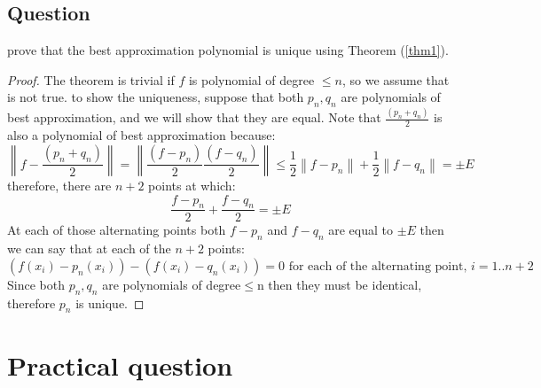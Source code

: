 \documentclass[]{article}
\newcommand{\norm}[1]{\left\lVert#1\right\rVert}
\begin{document}
\subsection{Question}
prove that the best approximation polynomial is unique using Theorem (\ref{thm1}). 
\begin{proof}
	The theorem is trivial if $f$ is polynomial of degree $\leq n$, so we assume that is not true. to show the uniqueness, suppose that both $p_n, q_n$ are polynomials of best approximation, and we will show that they are equal.
	Note that $\frac{(p_n + q_n)}{2}$ is also a polynomial of best approximation because:
	\begin{equation*}
		 \norm{f-\frac{(p_n + q_n)}{2}} = \norm{\frac{(f - p_n)}{2} \frac{(f - q_n)}{2}} \leq \frac{1}{2}\norm{f-p_n} + 
		 \frac{1}{2}\norm{f-q_n} = \pm E
	\end{equation*}
	therefore, there are $n+2$ points at which:
	\begin{equation*}
		\frac{f-p_n}{2}+\frac{f-q_n}{2}=\pm E
	\end{equation*}
	At each of those alternating points both $f-p_n$ and $f-q_n$ are equal to $\pm E$ then we can say that at each of the $n+2$ points:
	\begin{equation*}
		(f(x_i) - p_n(x_i)) - (f(x_i)-q_n(x_i)) = 0 \text{ for each of the alternating point, }i=1..n+2
	\end{equation*}
	Since both $p_n,q_n$ are polynomials of degree$\leq$n then they must be identical, therefore $p_n$ is unique.
\end{proof}

\section{Practical question}
\end{document}
